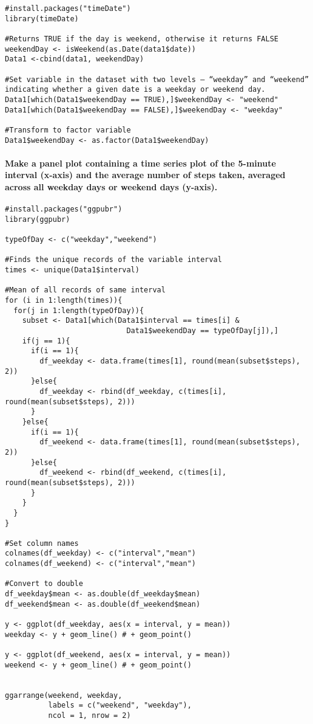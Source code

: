\documentclass[
]{article}
\begin{document}
\begin{verbatim}
#install.packages("timeDate")
library(timeDate)

#Returns TRUE if the day is weekend, otherwise it returns FALSE
weekendDay <- isWeekend(as.Date(data1$date))
Data1 <-cbind(data1, weekendDay)

#Set variable in the dataset with two levels – “weekday” and “weekend” indicating whether a given date is a weekday or weekend day.
Data1[which(Data1$weekendDay == TRUE),]$weekendDay <- "weekend"
Data1[which(Data1$weekendDay == FALSE),]$weekendDay <- "weekday"

#Transform to factor variable
Data1$weekendDay <- as.factor(Data1$weekendDay)
\end{verbatim}

\hypertarget{make-a-panel-plot-containing-a-time-series-plot-of-the-5-minute-interval-x-axis-and-the-average-number-of-steps-taken-averaged-across-all-weekday-days-or-weekend-days-y-axis.}{%
\paragraph{Make a panel plot containing a time series plot of the
5-minute interval (x-axis) and the average number of steps taken,
averaged across all weekday days or weekend days
(y-axis).}\label{make-a-panel-plot-containing-a-time-series-plot-of-the-5-minute-interval-x-axis-and-the-average-number-of-steps-taken-averaged-across-all-weekday-days-or-weekend-days-y-axis.}}

\begin{verbatim}
#install.packages("ggpubr")
library(ggpubr)

typeOfDay <- c("weekday","weekend")

#Finds the unique records of the variable interval
times <- unique(Data1$interval)

#Mean of all records of same interval
for (i in 1:length(times)){
  for(j in 1:length(typeOfDay)){
    subset <- Data1[which(Data1$interval == times[i] & 
                            Data1$weekendDay == typeOfDay[j]),]
    if(j == 1){
      if(i == 1){
        df_weekday <- data.frame(times[1], round(mean(subset$steps), 2))
      }else{
        df_weekday <- rbind(df_weekday, c(times[i],  round(mean(subset$steps), 2)))
      }
    }else{
      if(i == 1){
        df_weekend <- data.frame(times[1], round(mean(subset$steps), 2))
      }else{
        df_weekend <- rbind(df_weekend, c(times[i],  round(mean(subset$steps), 2)))
      }      
    }
  }
}

#Set column names
colnames(df_weekday) <- c("interval","mean")
colnames(df_weekend) <- c("interval","mean")

#Convert to double
df_weekday$mean <- as.double(df_weekday$mean)
df_weekend$mean <- as.double(df_weekend$mean)

y <- ggplot(df_weekday, aes(x = interval, y = mean))
weekday <- y + geom_line() # + geom_point()

y <- ggplot(df_weekend, aes(x = interval, y = mean))
weekend <- y + geom_line() # + geom_point()


ggarrange(weekend, weekday, 
          labels = c("weekend", "weekday"),
          ncol = 1, nrow = 2)
\end{verbatim}
\end{document}
